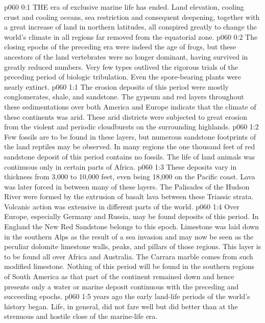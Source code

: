 \vs p060 0:1 THE era of exclusive marine life has ended. Land elevation, cooling crust and cooling oceans, sea restriction and consequent deepening, together with a great increase of land in northern latitudes, all conspired greatly to change the world’s climate in all regions far removed from the equatorial zone.
\vs p060 0:2 The closing epochs of the preceding era were indeed the age of frogs, but these ancestors of the land vertebrates were no longer dominant, having survived in greatly reduced numbers. Very few types outlived the rigorous trials of the preceding period of biologic tribulation. Even the spore\hyp{}bearing plants were nearly extinct.
\vs p060 1:1 The erosion deposits of this period were mostly conglomerates, shale, and sandstone. The gypsum and red layers throughout these sedimentations over both America and Europe indicate that the climate of these continents was arid. These arid districts were subjected to great erosion from the violent and periodic cloudbursts on the surrounding highlands.
\vs p060 1:2 Few fossils are to be found in these layers, but numerous sandstone footprints of the land reptiles may be observed. In many regions the one thousand feet of red sandstone deposit of this period contains no fossils. The life of land animals was continuous only in certain parts of Africa.
\vs p060 1:3 These deposits vary in thickness from 3,000 to 10,000 feet, even being 18,000 on the Pacific coast. Lava was later forced in between many of these layers. The Palisades of the Hudson River were formed by the extrusion of basalt lava between these Triassic strata. Volcanic action was extensive in different parts of the world.
\vs p060 1:4 Over Europe, especially Germany and Russia, may be found deposits of this period. In England the New Red Sandstone belongs to this epoch. Limestone was laid down in the southern Alps as the result of a sea invasion and may now be seen as the peculiar dolomite limestone walls, peaks, and pillars of those regions. This layer is to be found all over Africa and Australia. The Carrara marble comes from such modified limestone. Nothing of this period will be found in the southern regions of South America as that part of the continent remained down and hence presents only a water or marine deposit continuous with the preceding and succeeding epochs.
\vs p060 1:5 \pc {} years ago the early land\hyp{}life periods of the world’s history began. Life, in general, did not fare well but did better than at the strenuous and hostile close of the marine\hyp{}life era.
